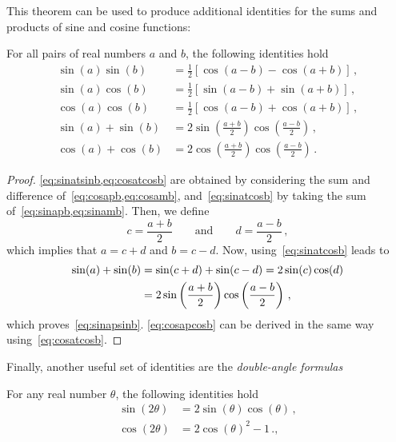 This theorem can be used to produce additional identities for the sums and products of
sine and cosine functions:
\begin{corollary}
  \label{cor:sumproduct}
  For all pairs of real numbers $a$ and $b$, the following identities hold
  \begin{align}
    \sin(a)\sin(b)&=\frac{1}{2}\left[\cos(a-b)-\cos(a+b)\right]\,,
    \label{eq:sinatsinb}\\
    \sin(a)\cos(b)&=\frac{1}{2}\left[\sin(a-b)+\sin(a+b)\right]\,,
    \label{eq:sinatcosb}\\
    \cos(a)\cos(b)&=\frac{1}{2}\left[\cos(a-b)+\cos(a+b)\right]\,,
    \label{eq:cosatcosb}\\
    \sin(a)+\sin(b)&=2\sin\left(\frac{a+b}{2}\right)\cos\left(\frac{a-b}{2}\right)\,,
    \label{eq:sinapsinb}\\
    \cos(a)+\cos(b)&=2\cos\left(\frac{a+b}{2}\right)\cos\left(\frac{a-b}{2}\right)\,.
    \label{eq:cosapcosb}
  \end{align}
\end{corollary}
\begin{proof}
  \cref{eq:sinatsinb,eq:cosatcosb} are obtained by considering the sum and difference
  of~\cref{eq:cosapb,eq:cosamb}, and~\cref{eq:sinatcosb} by taking the sum
  of~\cref{eq:sinapb,eq:sinamb}. Then, we define
  \begin{equation}
    c=\frac{a+b}{2}\qquad\text{and}\qquad d=\frac{a-b}{2}\,,
  \end{equation}
  which implies that $a=c+d$ and $b=c-d$. Now, using~\cref{eq:sinatcosb} leads to
  \begin{align}
    \sin(a)+\sin(b)&=\sin(c+d)+\sin(c-d)=2\sin(c)\cos(d)\notag\\
    &=2\sin\left(\frac{a+b}{2}\right)\cos\left(\frac{a-b}{2}\right)\,,
  \end{align}
  which proves~\cref{eq:sinapsinb}. \cref{eq:cosapcosb} can be derived in the same way
  using~\cref{eq:cosatcosb}.
\end{proof}
Finally, another useful set of identities are the \emph{double-angle formulas}
\begin{corollary}
  For any real number $\theta$, the following identities hold
  \begin{align}
    \sin(2\theta)&=2\sin(\theta)\cos(\theta)\,,\label{eq:doublesin}\\
    \cos(2\theta)&=2\cos(\theta)^2-1\,.,\label{eq:doublecos}
  \end{align}
\end{corollary}
